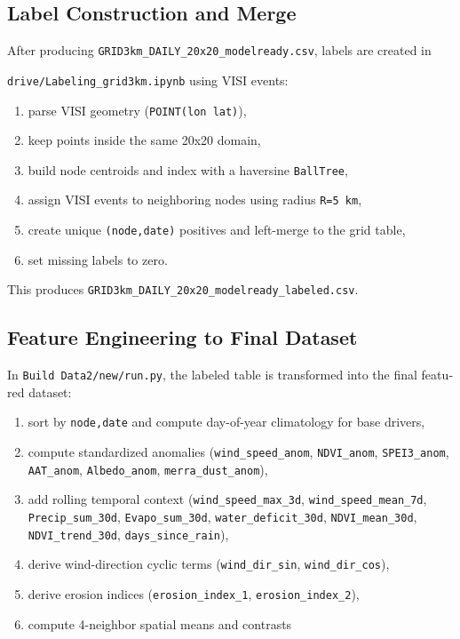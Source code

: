\documentclass[12pt,a4paper]{article}
\begin{document}
\begin{latin}
\subsection{Label Construction and Merge}
After producing \texttt{GRID3km\_DAILY\_20x20\_modelready.csv}, labels are created in 

\texttt{drive/Labeling\_grid3km.ipynb} using VISI events:
\begin{enumerate}
\item parse VISI geometry (\texttt{POINT(lon lat)}),
\item keep points inside the same 20x20 domain,
\item build node centroids and index with a haversine \texttt{BallTree},
\item assign VISI events to neighboring nodes using radius \texttt{R=5 km},
\item create unique \texttt{(node,date)} positives and left-merge to the grid table,
\item set missing labels to zero.
\end{enumerate}
This produces \texttt{GRID3km\_DAILY\_20x20\_modelready\_labeled.csv}.

\subsection{Feature Engineering to Final Dataset}
In \texttt{Build Data2/new/run.py}, the labeled table is transformed into the final featured dataset:
\begin{enumerate}
\item sort by \texttt{node,date} and compute day-of-year climatology for base drivers,
\item compute standardized anomalies (\texttt{wind\_speed\_anom}, \texttt{NDVI\_anom}, \texttt{SPEI3\_anom}, \texttt{AAT\_anom}, \texttt{Albedo\_anom}, \texttt{merra\_dust\_anom}),
\item add rolling temporal context (\texttt{wind\_speed\_max\_3d}, \texttt{wind\_speed\_mean\_7d}, \texttt{Precip\_sum\_30d}, \texttt{Evapo\_sum\_30d}, \texttt{water\_deficit\_30d}, \texttt{NDVI\_mean\_30d}, \texttt{NDVI\_trend\_30d}, \texttt{days\_since\_rain}),
\item derive wind-direction cyclic terms (\texttt{wind\_dir\_sin}, \texttt{wind\_dir\_cos}),
\item derive erosion indices (\texttt{erosion\_index\_1}, \texttt{erosion\_index\_2}),
\item compute 4-neighbor spatial means and contrasts 


\end{enumerate}
\end{latin}
\end{document}
